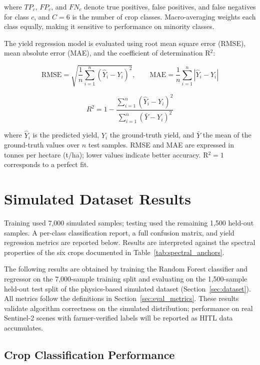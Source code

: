 \documentclass[12pt,a4paper,oneside]{report}
\begin{document}
where $TP_c$, $FP_c$, and $FN_c$ denote true positives, false positives, and false
negatives for class $c$, and $C = 6$ is the number of crop classes.
Macro-averaging weights each class equally, making it sensitive to performance on
minority classes.

The yield regression model is evaluated using root mean square error (RMSE),
mean absolute error (MAE), and the coefficient of determination R$^2$:

\begin{equation}
\mathrm{RMSE} = \sqrt{\frac{1}{n}\sum_{i=1}^{n}(\hat{Y}_i - Y_i)^2}, \qquad
\mathrm{MAE}  = \frac{1}{n}\sum_{i=1}^{n}|\hat{Y}_i - Y_i|
\label{eq:rmse_mae}
\end{equation}

\begin{equation}
R^2 = 1 - \frac{\displaystyle\sum_{i=1}^{n}(\hat{Y}_i - Y_i)^2}
               {\displaystyle\sum_{i=1}^{n}(\bar{Y}    - Y_i)^2}
\label{eq:r2}
\end{equation}

where $\hat{Y}_i$ is the predicted yield, $Y_i$ the ground-truth yield, and
$\bar{Y}$ the mean of the ground-truth values over $n$ test samples.
RMSE and MAE are expressed in tonnes per hectare (t/ha); lower values indicate
better accuracy. R$^2 = 1$ corresponds to a perfect fit.

\section{Simulated Dataset Results}
\label{sec:sim_results}

Training used 7,000 simulated samples; testing used the remaining 1,500 held-out samples. A per-class classification report, a full confusion matrix, and yield regression metrics are reported below. Results are interpreted against the spectral properties of the six crops documented in Table~\ref{tab:spectral_anchors}.

The following results are obtained by training the Random Forest classifier and
regressor on the 7,000-sample training split and evaluating on the 1,500-sample
held-out test split of the physics-based simulated dataset
(Section~\ref{sec:dataset}). All metrics follow the definitions in
Section~\ref{sec:eval_metrics}. These results validate algorithm correctness
on the simulated distribution; performance on real Sentinel-2 scenes with
farmer-verified labels will be reported as HITL data accumulates.

\subsection{Crop Classification Performance}
\end{document}

